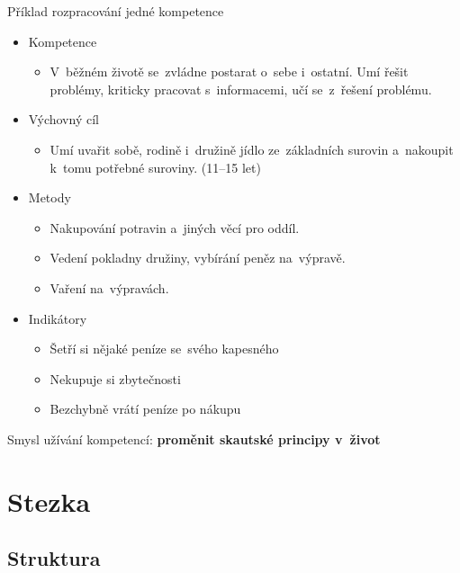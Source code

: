 \documentclass[compress, ucs, xelatex, 11pt, xcolor=dvipsnames, print, aspectratio=169,
	hyperref={
		bookmarks=true,
		unicode=true,
		colorlinks=true,
		pdftitle={Skautska vychovna metoda},
		plainpages=false,
		pdfauthor={Vojtech Zeisek},
		pdfsubject={Skautska vychovna metoda a jeji vyvoj za posledni stoleti a desetileti},
		pdfcreator={XeLaTeX},
		pdfkeywords={Junak, Pedagogika, Skaut, Skauting, Vychovna metoda},
		linkcolor=Red, %
		anchorcolor=ForestGreen, %
		citecolor=ForestGreen, %
		filecolor=ForestGreen, %
		menucolor=ForestGreen, %
		urlcolor=Sepia, %
		pdftex},
	url={hyphens, lowtilde} %
	]{beamer}
\begin{document}
\begin{frame}{Příklad rozpracování jedné kompetence}
	\begin{itemize}
		\item Kompetence
		\begin{itemize}
			\item V~běžném životě se~zvládne postarat o~sebe i~ostatní. Umí řešit problémy, kriticky pracovat s~informacemi, učí se~z~řešení problému.
		\end{itemize}
		\item Výchovný cíl
		\begin{itemize}
			\item Umí uvařit sobě, rodině i~družině jídlo ze~základních surovin a~nakoupit k~tomu potřebné suroviny. (11--15 let)
		\end{itemize}
		\item Metody
		\begin{itemize}
			\item Nakupování potravin a~jiných věcí pro oddíl.
			\item Vedení pokladny družiny, vybírání peněz na~výpravě.
			\item Vaření na~výpravách.
		\end{itemize}
		\item Indikátory
		\begin{itemize}
			\item Šetří si nějaké peníze se~svého kapesného
			\item Nekupuje si zbytečnosti
			\item Bezchybně vrátí peníze po nákupu
		\end{itemize}
	\end{itemize}
	\alert{Smysl užívání kompetencí: \textbf{proměnit skautské principy v~život}}
\end{frame}

\section{Stezka}

\subsection{Struktura}
\end{document}

